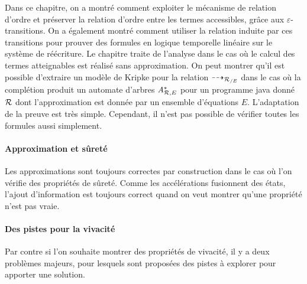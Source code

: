 Dans ce chapitre, on a montré comment
exploiter le mécanisme de relation d'ordre et préserver la relation d'ordre
entre les termes accessibles, grâce aux $\varepsilon$-transitions.
On a également montré comment utiliser la relation induite par ces transitions pour prouver des 
formules en logique temporelle linéaire sur le système de réécriture. Le chapitre traite de l'analyse 
dans le cas où le calcul des termes atteignables est réalisé sans approximation.
On peut montrer qu'il est possible d'extraire un modèle de Kripke pour la relation $\dashrightarrow_{{\mathcal R_{/E}}}$ 
dans le cas où la complétion produit un automate d'arbres ${\mathit A}_{\mathcal R,E}^*$ pour un programme java
donné $\mathcal R$ dont l'approximation est donnée par un ensemble d'équations $E$.
L'adaptation de la preuve est très simple. Cependant, il n'est pas possible de vérifier
toutes les formules aussi simplement.

\paragraph{Approximation et  sûreté}
Les approximations sont toujours correctes par construction dans le cas où l'on vérifie
des propriétés de sûreté. Comme les accélérations fusionnent des états,
l'ajout d'information est toujours correct quand on veut montrer qu'une propriété n'est pas
vraie.

\paragraph{Des pistes pour la vivacité}
Par contre si l'on souhaite montrer des propriétés de vivacité, il y a deux problèmes majeurs, pour lesquels
sont proposées des pistes à explorer pour apporter une solution.

